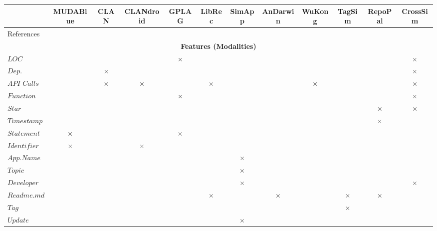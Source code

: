 \begin{landscape}
	\begin{table}[htbp]
		\footnotesize
		\centering
		\begin{tabular}{|p{1.6cm}|c|c|c|c|c|c|c|c|c|c|c|}  
			\hline 
			& \textbf{MUDABlue} & \textbf{CLAN} & \textbf{CLANdroid} & \textbf{GPLAG} & \textbf{LibRec} & \textbf{SimApp} & \textbf{AnDarwin} & \textbf{WuKong} & \textbf{TagSim} & \textbf{RepoPal} & \textbf{CrossSim} \\\hline			
			References & \cite{10.1109/APSEC.2004.69} & \cite{McMillan:2012:DSS:2337223.2337267} & \cite{10.1109ICPC.2016.7503721} & \cite{Liu:2006:GDS:1150402.1150522} & \cite{6671293} & \cite{Chen:2015:SFD:2684822.2685305} & \cite{Crussell2013} &  \cite{Wang:2015:WSA:2771783.2771795} & \cite{Lo:2012:DSA:2473496.2473616} & \cite{10.1109/SANER.2017.7884605} & \cite{NDRDSEAA2018} \\\hline
			\multicolumn{12}{|c|}{\bf Features (Modalities)}  \\ \cline{1-12}
			$LOC$ &  &  &  & $\times$ &  &  &  &  &  & &   $\times$ \\\hline
			$Dep.$ &  & $\times$ &  &  &  &  &  &  &  &  & $\times$ \\\hline
			$API$ $Calls$ &  & $\times$ & $\times$ &  & $\times$ &  &  & $\times$ &  & &  $\times$ \\\hline
			$Function$ &  &  &  & $\times$ &  &  &  &  &  &  &  $\times$ \\\hline
			$Star$ &  &  &  &  &  &  &  &   &  & $\times$ &  $\times$ \\\hline
			$Timestamp$ &  &  &  &  &  &  &  &  &   & $\times$  & \\\hline
			$Statement$ & $\times$ &  &  & $\times$ &  &  &  &  &  &   & \\\hline
			$Identifier$  & $\times$ &  & $\times$ &  &  &  &  &  &   &  & \\\hline
			$App. Name$ &  &  &  &  &  & $\times$ &  &  &  & & \\\hline
			$Topic$ &  &  &  &  &  & $\times$ &  &  &  &  & \\\hline
			$Developer$ &  &  &  &  &  & $\times$ &  &  &  &  &  $\times$ \\\hline
			$Readme.md$ &  &  &  &  & $\times$ &  & $\times$ &  & $\times$ & $\times$  & \\\hline
			$Tag$ &  &  &  &  &  &  &  &  & $\times$ &  & \\\hline
			$Update$ &  &  &  &  &  & $\times$ &  &  &   &  & \\\hline

\end{tabular}
\end{table}
\end{landscape}
